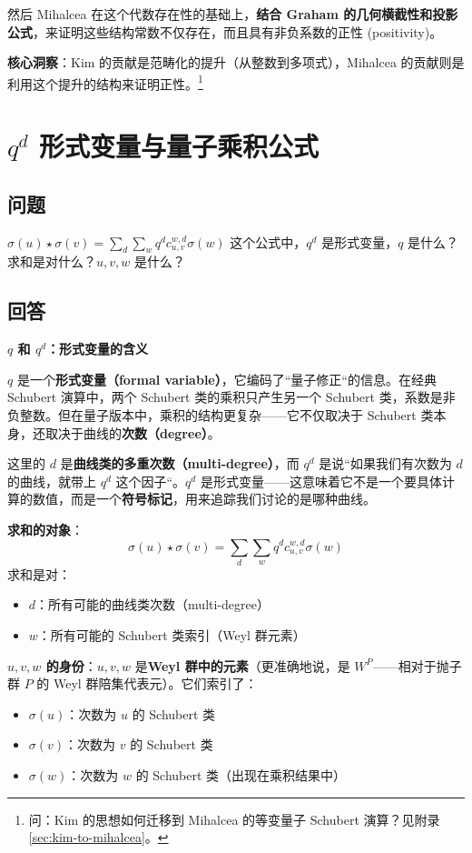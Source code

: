 然后 Mihalcea 在这个代数存在性的基础上，\textbf{结合 Graham 的几何横截性和投影公式}，来证明这些结构常数不仅存在，而且具有非负系数的正性 (positivity)。

\textbf{核心洞察}：Kim 的贡献是范畴化的提升（从整数到多项式），Mihalcea 的贡献则是利用这个提升的结构来证明正性。\footnote{问：Kim 的思想如何迁移到 Mihalcea 的等变量子 Schubert 演算？见附录 \cref{sec:kim-to-mihalcea}。}
\section{$q^d$ 形式变量与量子乘积公式}\label{sec:q-formal-variable}
\subsection{问题}
$\sigma(u) \star \sigma(v) = \sum_d \sum_w q^d c_{u,v}^{w,d} \sigma(w)$ 这个公式中，$q^d$ 是形式变量，$q$ 是什么？求和是对什么？$u, v, w$ 是什么？
\subsection{回答}
\textbf{$q$ 和 $q^d$：形式变量的含义}

$q$ 是一个\textbf{形式变量（formal variable）}，它编码了``量子修正``的信息。在经典 Schubert 演算中，两个 Schubert 类的乘积只产生另一个 Schubert 类，系数是非负整数。但在量子版本中，乘积的结构更复杂——它不仅取决于 Schubert 类本身，还取决于曲线的\textbf{次数（degree）}。

这里的 $d$ 是\textbf{曲线类的多重次数（multi-degree）}，而 $q^d$ 是说``如果我们有次数为 $d$ 的曲线，就带上 $q^d$ 这个因子``。$q^d$ 是形式变量——这意味着它不是一个要具体计算的数值，而是一个\textbf{符号标记}，用来追踪我们讨论的是哪种曲线。

\textbf{求和的对象}：$$\sigma(u) \star \sigma(v) = \sum_{d} \sum_{w} q^d c_{u,v}^{w,d} \sigma(w)$$
求和是对：
\begin{itemize}
\item $d$：所有可能的曲线类次数（multi-degree）
\item $w$：所有可能的 Schubert 类索引（Weyl 群元素）
\end{itemize}

\textbf{$u, v, w$ 的身份}：$u, v, w$ 是\textbf{Weyl 群中的元素}（更准确地说，是 $W^P$——相对于抛子群 $P$ 的 Weyl 群陪集代表元）。它们索引了：
\begin{itemize}
\item $\sigma(u)$：次数为 $u$ 的 Schubert 类
\item $\sigma(v)$：次数为 $v$ 的 Schubert 类
\item $\sigma(w)$：次数为 $w$ 的 Schubert 类（出现在乘积结果中）
\end{itemize}

